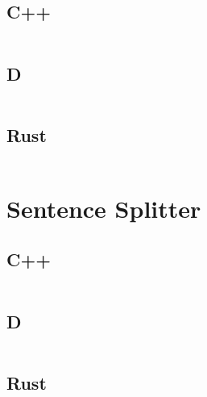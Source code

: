 \documentclass[finalcopy]{srpaper}
\begin{document}
\subsection{C++}
\begin{mdframed}[linecolor=black]
\inputminted{cpp}{../examples/hello-world/hello_world.cpp}
\end{mdframed}

\subsection{D}
\begin{mdframed}[linecolor=black]
\inputminted{d}{../examples/hello-world/hello_world.d}
\end{mdframed}

\subsection{Rust}
\begin{mdframed}[linecolor=black]
\inputminted{rust}{../examples/hello-world/hello_world.rs}
\end{mdframed}

\section{Sentence Splitter}
\subsection{C++}
\begin{mdframed}[linecolor=black]
\inputminted[fontsize=\scriptsize]{cpp}{../examples/sentence-splitter/sentence_splitter.cpp}
\end{mdframed}

\subsection{D}
\begin{mdframed}[linecolor=black]
\inputminted[fontsize=\scriptsize]{d}{../examples/sentence-splitter/sentence_splitter.d}
\end{mdframed}

\subsection{Rust}
\begin{mdframed}[linecolor=black]
\inputminted[fontsize=\scriptsize]{rust}{../examples/sentence-splitter/sentence_splitter.rs}
\end{mdframed}
\end{document}
